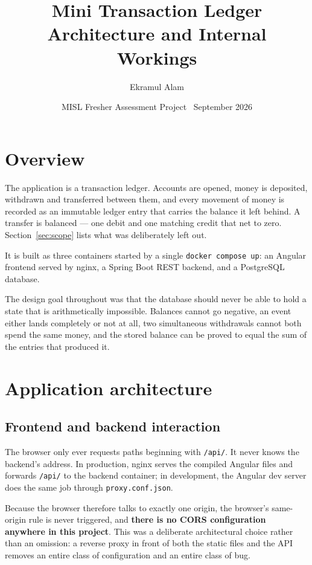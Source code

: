 \documentclass[11pt,a4paper]{article}
\title{\vspace{-1.5cm}\textbf{Mini Transaction Ledger}\\[2pt]
       \large Architecture and Internal Workings}
\author{Ekramul Alam}
\date{MISL Fresher Assessment Project \textperiodcentered\ September 2026}
\begin{document}
\maketitle

\section{Overview}

The application is a transaction ledger. Accounts are opened, money is deposited, withdrawn and
transferred between them, and every movement of money is recorded as an immutable ledger entry
that carries the balance it left behind. A transfer is balanced --- one debit and one matching
credit that net to zero. Section~\ref{sec:scope} lists what was deliberately left out.

It is built as three containers started by a single \texttt{docker compose up}: an Angular
frontend served by nginx, a Spring Boot REST backend, and a PostgreSQL database.

The design goal throughout was that the database should never be able to hold a state that is
arithmetically impossible. Balances cannot go negative, an event either lands completely or not at
all, two simultaneous withdrawals cannot both spend the same money, and the stored balance can be
proved to equal the sum of the entries that produced it.

\section{Application architecture}

\subsection{Frontend and backend interaction}

The browser only ever requests paths beginning with \texttt{/api/}. It never knows the backend's
address. In production, nginx serves the compiled Angular files and forwards \texttt{/api/} to the
backend container; in development, the Angular dev server does the same job through
\texttt{proxy.conf.json}.

Because the browser therefore talks to exactly one origin, the browser's same-origin rule is never
triggered, and \textbf{there is no CORS configuration anywhere in this project}. This was a
deliberate architectural choice rather than an omission: a reverse proxy in front of both the
static files and the API removes an entire class of configuration and an entire class of bug.
\end{document}
